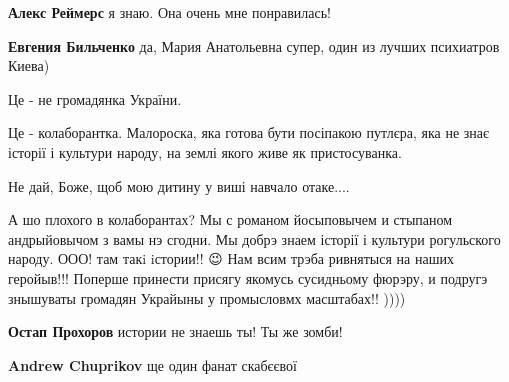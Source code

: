 \begin{itemize}
\begin{itemize}
\textbf{Алекс Реймерс} я знаю. Она очень мне понравилась!

 
\textbf{Евгения Бильченко} да, Мария Анатольевна супер, один из лучших психиатров Киева)
\end{itemize}


Це - не громадянка України.

Це - колаборантка. Малороска, яка готова бути посіпакою путлєра, яка не знає
історії і культури народу, на землі якого живе як пристосуванка.

Не дай, Боже, щоб мою дитину у виші навчало отаке....

\begin{itemize}
 

А шо плохого в колаборантах? Мы с романом йосыповычем и стыпаном андрыйовычом з
вамы нэ сгодни. Мы добрэ знаем історії і культури рогульского народу. ООО! там
такi iстории!! 😉 Нам всим трэба ривнятыся на наших геройыв!!! Поперше принести
присягу якомусь сусидньому фюрэру, и подругэ знышуваты громадян Украйыны у
промысловмх масштабах!! ))))


 
\textbf{Остап Прохоров} истории не знаешь ты! Ты же зомби!

 
\textbf{Andrew Chuprikov} ще один фанат скабєєвої


\end{itemize}
\end{itemize}
